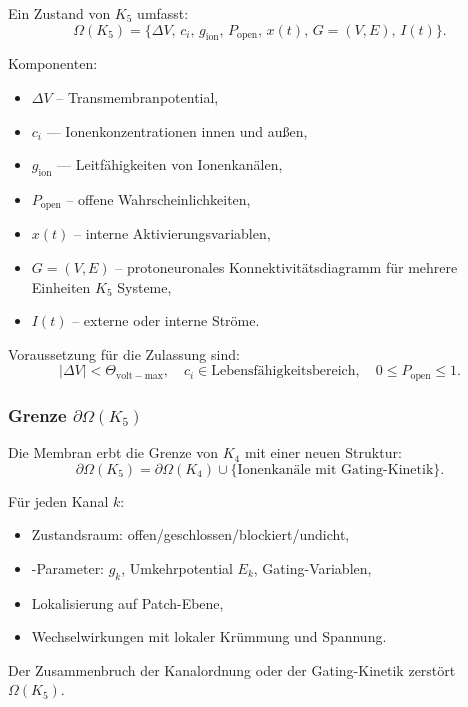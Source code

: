 Ein Zustand von $K_5$ umfasst:
\[
\Omega(K_5) = \{ \Delta V,\, c_i,\, g_{\mathrm{ion}},\,
                P_{\mathrm{open}},\,
                x(t),\,
                G=(V,E),\,
                I(t) \}.
\]

Komponenten:
\begin{itemize}
    \item $\Delta V$ – Transmembranpotential,
    \item $c_i$ — Ionenkonzentrationen innen und außen,
    \item $g_{\mathrm{ion}}$ — Leitfähigkeiten von Ionenkanälen,
    \item $P_{\mathrm{open}}$ – offene Wahrscheinlichkeiten,
    \item $x(t)$ – interne Aktivierungsvariablen,
    \item $G=(V,E)$ – protoneuronales Konnektivitätsdiagramm für mehrere Einheiten
          $K_5$ Systeme,
    \item $I(t)$ – externe oder interne Ströme.
\end{itemize}

Voraussetzung für die Zulassung sind:
\[
|\Delta V| < \Theta_{\mathrm{volt-max}}, \quad
c_i \in \text{Lebensfähigkeitsbereich}, \quad
0 \le P_{\mathrm{open}} \le 1.
\]

\subsubsection{Grenze \texorpdfstring{$\partial\Omega(K_5)$}{\partial\Omega(K_5)}}

Die Membran erbt die Grenze von $K_4$ mit einer neuen Struktur:
\[
\partial\Omega(K_5)
    = \partial\Omega(K_4)
      \cup \{ \text{Ionenkanäle mit Gating-Kinetik} \}.
\]

Für jeden Kanal $k$:
\begin{itemize}
    \item Zustandsraum: offen/geschlossen/blockiert/undicht,
    \item-Parameter: $g_k$, Umkehrpotential $E_k$, Gating-Variablen,
    \item Lokalisierung auf Patch-Ebene,
    \item Wechselwirkungen mit lokaler Krümmung und Spannung.
\end{itemize}

Der Zusammenbruch der Kanalordnung oder der Gating-Kinetik zerstört $\Omega(K_5)$.

